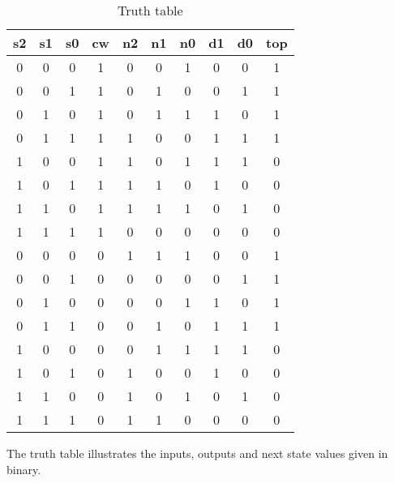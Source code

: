 
\begin{center}
\begin{table}
\begin{tabular}{cccc|cccccc}
s2 & s1 & s0 & cw & n2 & n1 & n0 & d1 & d0 & top\tabularnewline
\hline
\hline 
0 & 0 & 0 & 1 & 0 & 0 & 1 & 0 & 0 & 1\tabularnewline
\hline
0 & 0 & 1 & 1 & 0 & 1 & 0 & 0 & 1 & 1\tabularnewline
\hline 
0 & 1 & 0 & 1 & 0 & 1 & 1 & 1 & 0 & 1\tabularnewline
\hline 
0 & 1 & 1 & 1 & 1 & 0 & 0 & 1 & 1 & 1\tabularnewline
\hline 
1 & 0 & 0 & 1 & 1 & 0 & 1 & 1 & 1 & 0\tabularnewline
\hline 
1 & 0 & 1 & 1 & 1 & 1 & 0 & 1 & 0 & 0\tabularnewline
\hline 
1 & 1 & 0 & 1 & 1 & 1 & 1 & 0 & 1 & 0\tabularnewline
\hline 
1 & 1 & 1 & 1 & 0 & 0 & 0 & 0 & 0 & 0\tabularnewline
\hline 
0 & 0 & 0 & 0 & 1 & 1 & 1 & 0 & 0 & 1\tabularnewline
\hline 
0 & 0 & 1 & 0 & 0 & 0 & 0 & 0 & 1 & 1\tabularnewline
\hline 
0 & 1 & 0 & 0 & 0 & 0 & 1 & 1 & 0 & 1\tabularnewline
\hline 
0 & 1 & 1 & 0 & 0 & 1 & 0 & 1 & 1 & 1\tabularnewline
\hline 
1 & 0 & 0 & 0 & 0 & 1 & 1 & 1 & 1 & 0\tabularnewline
\hline 
1 & 0 & 1 & 0 & 1 & 0 & 0 & 1 & 0 & 0\tabularnewline
\hline 
1 & 1 & 0 & 0 & 1 & 0 & 1 & 0 & 1 & 0\tabularnewline
\hline 
1 & 1 & 1 & 0 & 1 & 1 & 0 & 0 & 0 & 0\tabularnewline
\hline
\end{tabular}
\caption{Truth table \label{table:truth table} }
\end{table}
\end{center}
The truth table illustrates the inputs, outputs and next state values given in binary.